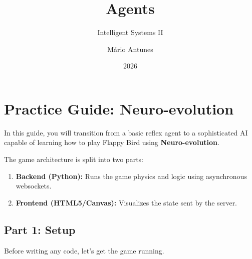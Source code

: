 \documentclass[
  12pt,
]{article}
\title{Agents}
\subtitle{Intelligent Systems II}
\author{Mário Antunes}
\date{2026}
\providecommand{\tightlist}{%
  \setlength{\itemsep}{0pt}\setlength{\parskip}{0pt}}
\begin{document}
\maketitle

\section{Practice Guide:
Neuro-evolution}\label{practice-guide-neuro-evolution}

In this guide, you will transition from a basic reflex agent to a
sophisticated AI capable of learning how to play Flappy Bird using
\textbf{Neuro-evolution}.

The game architecture is split into two parts:

\begin{enumerate}
\def\labelenumi{\arabic{enumi}.}
\tightlist
\item
  \textbf{Backend (Python):} Runs the game physics and logic using
  asynchronous websockets.
\item
  \textbf{Frontend (HTML5/Canvas):} Visualizes the state sent by the
  server.
\end{enumerate}

\subsection{Part 1: Setup}\label{part-1-setup}

Before writing any code, let's get the game running.
\end{document}
